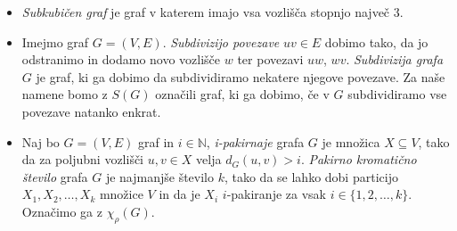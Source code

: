 \documentclass[11pt,a4paper,titlepage]{article}
\begin{document}
\begin{itemize}
    \item \emph{Subkubičen graf} je graf v katerem imajo vsa vozlišča stopnjo največ 3.
    \item Imejmo graf $G=(V, E)$. \emph{Subdivizijo povezave} $uv\in E$ dobimo tako, da jo odstranimo in dodamo novo vozlišče $w$ ter povezavi
          $uw$, $wv$. \emph{Subdivizija grafa} $G$ je graf, ki ga dobimo da subdividiramo nekatere njegove povezave. Za naše namene bomo z $S(G)$
          označili graf, ki ga dobimo, če v $G$ subdividiramo vse povezave natanko enkrat.
    \item Naj bo $G=(V, E)$ graf in $i\in \mathbb{N}$, \emph{i-pakirnaje} grafa $G$ je množica $X \subseteq V$, tako da za poljubni 
          vozlišči $u, v\in X$ velja $d_G(u, v) > i$. \emph{Pakirno kromatično število} grafa $G$ je najmanjše število $k$, tako da se lahko dobi
          particijo $X_1, X_2, \dots, X_k$ množice $V$ in da je $X_i$ $i$-pakiranje za vsak $i\in \{1, 2, \dots, k\}$. Označimo ga z $\chi_\rho(G)$.

\end{itemize}
\end{document}
